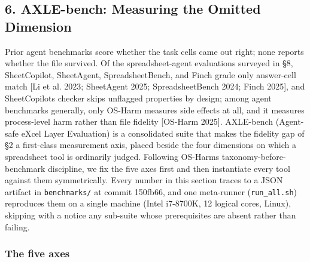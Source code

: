 \documentclass[
]{article}
\newcounter{none} %
\begin{document}
\subsection{6. AXLE-bench: Measuring the Omitted
Dimension}\label{6-axle-bench-measuring-the-omitted-dimension}

Prior agent benchmarks score whether the task cells came out right; none
reports whether the file survived. Of the spreadsheet-agent evaluations
surveyed in §8, SheetCopilot, SheetAgent, SpreadsheetBench, and Finch
grade only answer-cell match {[}Li et al. 2023; SheetAgent 2025;
SpreadsheetBench 2024; Finch 2025{]}, and SheetCopilot\textquotesingle s
checker skips unflagged properties by design; among agent benchmarks
generally, only OS-Harm measures side effects at all, and it measures
process-level harm rather than file fidelity {[}OS-Harm 2025{]}.
AXLE-bench (Agent-safe eXcel Layer Evaluation) is a consolidated suite
that makes the fidelity gap of §2 a first-class measurement axis, placed
beside the four dimensions on which a spreadsheet tool is ordinarily
judged. Following OS-Harm\textquotesingle s taxonomy-before-benchmark
discipline, we fix the five axes first and then instantiate every tool
against them symmetrically. Every number in this section traces to a
JSON artifact in \texttt{benchmarks/} at commit 150fb66, and one
meta-runner (\texttt{run\_all.sh}) reproduces them on a single machine
(Intel i7-8700K, 12 logical cores, Linux), skipping with a notice any
sub-suite whose prerequisites are absent rather than failing.

\subsubsection{The five axes}\label{the-five-axes}
\end{document}
